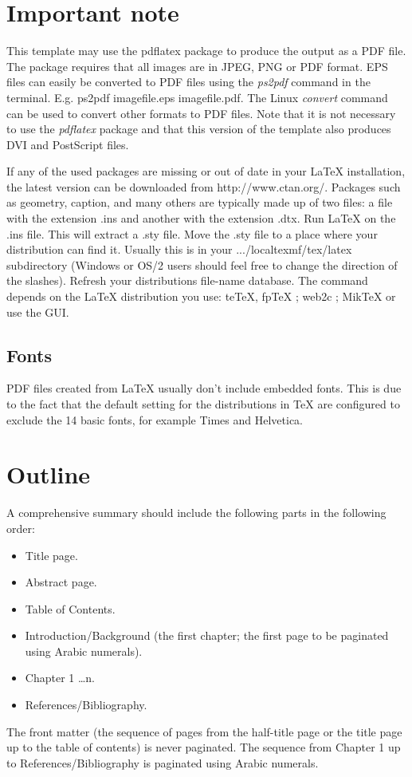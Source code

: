 \section{Important note}
This template may use the pdflatex package to produce the output
as a PDF file. The package requires that all images are in JPEG,
PNG or PDF format. EPS files can easily be converted to PDF files
using the \emph{ps2pdf} command in the terminal. E.g. ps2pdf
imagefile.eps imagefile.pdf. The Linux \emph{convert} command can
be used to convert other formats to PDF files. Note that it is not
necessary to use the \textit{pdflatex} package and that this
version of the template also produces DVI and PostScript files.    

If any of the used packages are missing or out of date in your
\LaTeX{} installation, the latest version can be downloaded from
http://www.ctan.org/. Packages such as geometry, caption, and many
others are typically made 
up of two files: a file with the extension .ins and another with
the extension .dtx. Run \LaTeX{} on the .ins file. 
This will extract a .sty file. Move the .sty file to a place where
your distribution can find it. Usually this is in your
.../localtexmf/tex/latex subdirectory (Windows or OS/2 users
should feel free to change the direction of the slashes). Refresh
your distributions file-name database. The command depends on the
\LaTeX{} distribution you use: te\TeX{}, fp\TeX{} ;
web2c ; Mik\TeX{}  or
use the GUI. 
 
\subsection{Fonts}
PDF files created from \LaTeX{} usually don't include embedded
fonts. This is due to the fact that the default setting for the
distributions in TeX are configured to exclude the 14 basic fonts,
for example Times and Helvetica.

\section{Outline}
A comprehensive summary should include the following parts in the following order:
\begin{itemize}
    \item Title page.
    \item Abstract page.
    \item Table of Contents.
    \item Introduction/Background (the first chapter; the first page to be paginated using Arabic numerals).
    \item Chapter 1 \ldots n.
    \item References/Bibliography.
\end{itemize}
\vspace{1\baselineskip}
\noindent The front matter (the sequence of pages from the half-title page or the title page up to the table of contents) is never paginated. The sequence from Chapter 1 up to References/Bibliography is paginated using Arabic numerals. 
